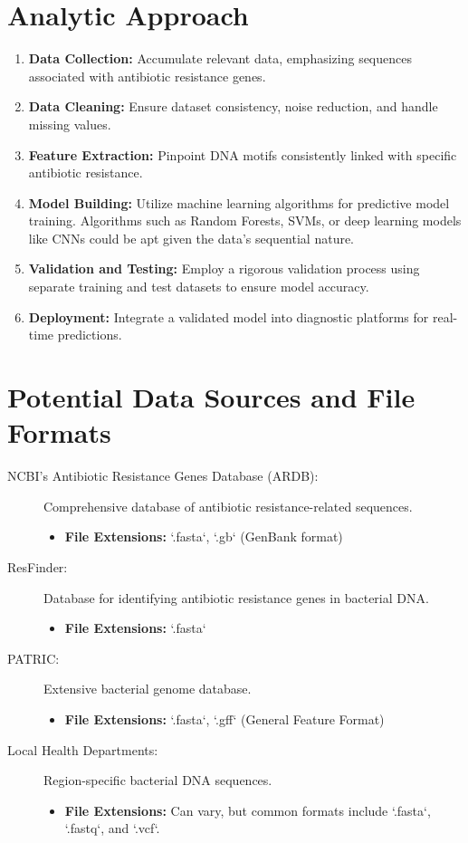 \documentclass[12pt]{article}
\begin{document}
\section{Analytic Approach}
\begin{enumerate}
    \item \textbf{Data Collection:} Accumulate relevant data, emphasizing sequences associated with antibiotic resistance genes.
    \item \textbf{Data Cleaning:} Ensure dataset consistency, noise reduction, and handle missing values.
    \item \textbf{Feature Extraction:} Pinpoint DNA motifs consistently linked with specific antibiotic resistance.
    \item \textbf{Model Building:} Utilize machine learning algorithms for predictive model training. Algorithms such as Random Forests, SVMs, or deep learning models like CNNs could be apt given the data's sequential nature.
    \item \textbf{Validation and Testing:} Employ a rigorous validation process using separate training and test datasets to ensure model accuracy.
    \item \textbf{Deployment:} Integrate a validated model into diagnostic platforms for real-time predictions.
\end{enumerate}

\section{Potential Data Sources and File Formats}
\begin{description}
    \item[NCBI's Antibiotic Resistance Genes Database (ARDB):] Comprehensive database of antibiotic resistance-related sequences.
    \begin{itemize}
        \item \textbf{File Extensions:} `.fasta`, `.gb` (GenBank format)
    \end{itemize}
    \item[ResFinder:] Database for identifying antibiotic resistance genes in bacterial DNA.
    \begin{itemize}
        \item \textbf{File Extensions:} `.fasta`
    \end{itemize}
    \item[PATRIC:] Extensive bacterial genome database.
    \begin{itemize}
        \item \textbf{File Extensions:} `.fasta`, `.gff` (General Feature Format)
    \end{itemize}
    \item[Local Health Departments:] Region-specific bacterial DNA sequences.
    \begin{itemize}
        \item \textbf{File Extensions:} Can vary, but common formats include `.fasta`, `.fastq`, and `.vcf`.
    \end{itemize}
\end{description}
\end{document}
